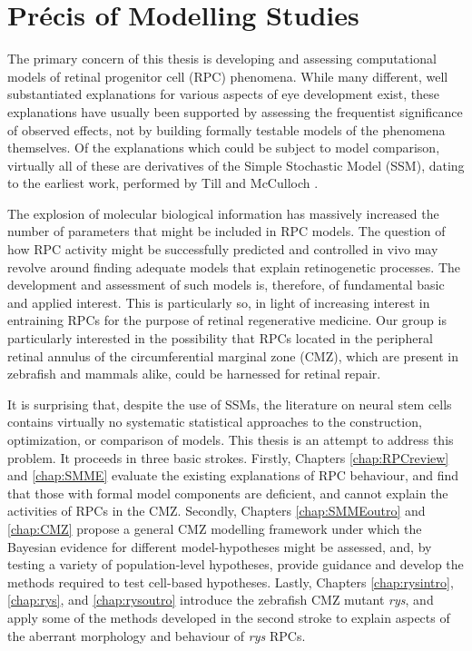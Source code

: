\section*{Pr\'{e}cis of Modelling Studies}
\label{ch:precis}

The primary concern of this thesis is developing and assessing computational models of retinal progenitor cell (RPC) phenomena. While many different, well substantiated explanations for various aspects of eye development exist, these explanations have usually been supported by assessing the frequentist significance of observed effects, not by building formally testable models of the phenomena themselves. Of the explanations which could be subject to model comparison, virtually all of these are derivatives of the Simple Stochastic Model (SSM), dating to the earliest work, performed by Till and McCulloch \cite{Till1964}.

The explosion of molecular biological information has massively increased the number of parameters that might be included in RPC models. The question of how RPC activity might be successfully predicted and controlled in vivo may revolve around finding adequate models that explain retinogenetic processes. The development and assessment of such models is, therefore, of fundamental basic and applied interest. This is particularly so, in light of increasing interest in entraining RPCs for the purpose of retinal regenerative medicine. Our group is particularly interested in the possibility that RPCs located in the peripheral retinal annulus of the circumferential marginal zone (CMZ), which are present in zebrafish and mammals alike, could be harnessed for retinal repair.

It is surprising that, despite the use of SSMs, the literature on neural stem cells contains virtually no systematic statistical approaches to the construction, optimization, or comparison of models. This thesis is an attempt to address this problem. It proceeds in three basic strokes. Firstly, Chapters \ref{chap:RPCreview} and \ref{chap:SMME} evaluate the existing explanations of RPC behaviour, and find that those with formal model components are deficient, and cannot explain the activities of RPCs in the CMZ. Secondly, Chapters \ref{chap:SMMEoutro} and \ref{chap:CMZ} propose a general CMZ modelling framework under which the Bayesian evidence for different model-hypotheses might be assessed, and, by testing a variety of population-level hypotheses, provide guidance and develop the methods required to test cell-based hypotheses. Lastly, Chapters \ref{chap:rysintro}, \ref{chap:rys}, and \ref{chap:rysoutro} introduce the zebrafish CMZ mutant \textit{rys}, and apply some of the methods developed in the second stroke to explain aspects of the aberrant morphology and behaviour of \textit{rys} RPCs. 

